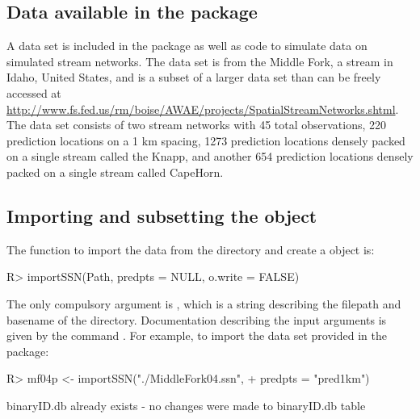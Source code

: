 \documentclass[nojss]{jss}
\renewenvironment{Schunk}{\vspace{\topsep}}{\vspace{\topsep}}
\begin{document}
\subsection[Data available in the SSN package]{Data available in the  package}

A data set is included in the  package as well as code to
simulate data on simulated stream networks. The data set is from the Middle Fork, a stream in Idaho, United States, and is a subset of a larger data set than can be freely accessed at \url{http://www.fs.fed.us/rm/boise/AWAE/projects/SpatialStreamNetworks.shtml}.  The data set consists of two stream networks with 45 total observations, 220 prediction locations on a 1 km spacing, 1273 prediction locations densely packed on a single stream called the Knapp, and another 654 prediction locations densely packed on a single stream called CapeHorn.


\subsection[Importing and subsetting the SpatialStreamNetwork object]{Importing and subsetting the  object}\label{ImportSSN}

The function to import the data from the  directory and create a
 object is:
\begin{Schunk}
\begin{Sinput}
R> importSSN(Path, predpts = NULL, o.write = FALSE)
\end{Sinput}
\end{Schunk}

The only compulsory argument is , which is a string
describing the filepath and basename of the 
directory. Documentation describing the input arguments is given by
the command . For example, to import the
 data set provided in the  package:
\begin{Schunk}
\begin{Sinput}
R> mf04p <- importSSN("./MiddleFork04.ssn",
+     predpts = "pred1km")
\end{Sinput}
\begin{Soutput}
binaryID.db already exists - no changes were made to binaryID.db table
\end{Soutput}
\end{Schunk}
\end{document}
